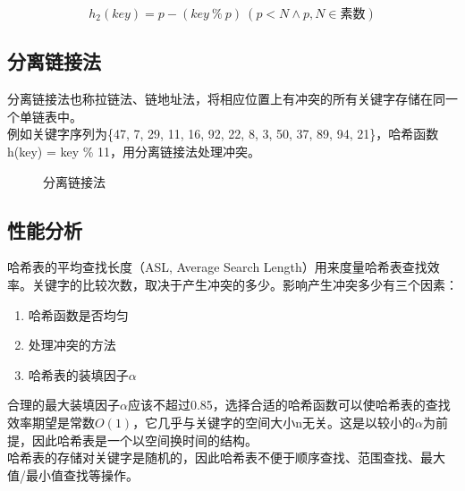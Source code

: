 \vspace{-0.5cm}

$$
	h_2(key) = p - (key\ \%\ p)\ \left(p < N \wedge p, N \in \text{素数}\right)
$$

\vspace{0.5cm}

\subsection{分离链接法}

分离链接法也称拉链法、链地址法，将相应位置上有冲突的所有关键字存储在同一个单链表中。\\

例如关键字序列为\{47, 7, 29, 11, 16, 92, 22, 8, 3, 50, 37, 89, 94, 21\}，哈希函数h(key) = key \% 11，用分离链接法处理冲突。

\begin{figure}[H]
	\centering
	\caption{分离链接法}
\end{figure}

\vspace{0.5cm}

\subsection{性能分析}

哈希表的平均查找长度（ASL, Average Search Length）用来度量哈希表查找效率。关键字的比较次数，取决于产生冲突的多少。影响产生冲突多少有三个因素：

\begin{enumerate}
	\item 哈希函数是否均匀
	\item 处理冲突的方法
	\item 哈希表的装填因子$ \alpha $
\end{enumerate}

合理的最大装填因子$ \alpha $应该不超过0.85，选择合适的哈希函数可以使哈希表的查找效率期望是常数$ O(1) $，它几乎与关键字的空间大小n无关。这是以较小的$ \alpha $为前提，因此哈希表是一个以空间换时间的结构。\\

哈希表的存储对关键字是随机的，因此哈希表不便于顺序查找、范围查找、最大值/最小值查找等操作。

\newpage